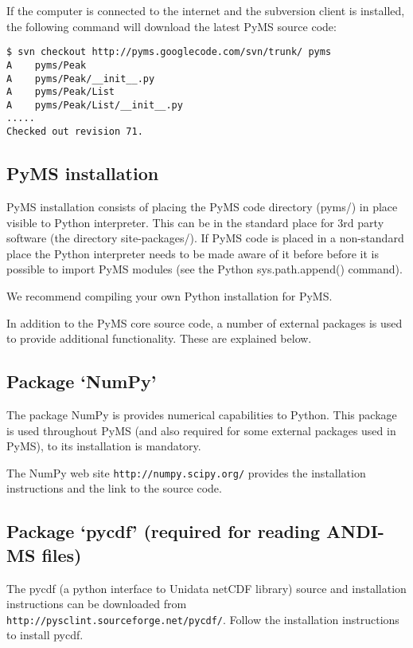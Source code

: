 If the computer is connected to the internet and the subversion client
is installed, the following command will download the latest PyMS source
code:

\begin{verbatim}
$ svn checkout http://pyms.googlecode.com/svn/trunk/ pyms
A    pyms/Peak
A    pyms/Peak/__init__.py
A    pyms/Peak/List
A    pyms/Peak/List/__init__.py
.....
Checked out revision 71.
\end{verbatim}

\subsection{PyMS installation}

PyMS installation consists of placing the PyMS code directory (pyms/) in
place visible to Python interpreter.  This can be in the standard place
for 3rd party software (the directory site-packages/). If PyMS code is
placed in a non-standard place the Python interpreter needs to be made
aware of it before before it is possible to import PyMS modules (see the
Python sys.path.append() command).

We recommend compiling your own Python installation for PyMS.

In addition to the PyMS core source code, a number of external packages
is used to provide additional functionality. These are explained below.

\subsection{\label{subsec:numpy}Package `NumPy'}

The package NumPy is provides numerical capabilities to Python. This
package is used throughout PyMS (and also required for some external
packages used in PyMS), to its installation is mandatory.

The NumPy web site {\tt http://numpy.scipy.org/} provides the installation
instructions and the link to the source code.

\subsection{\label{subsec:pycdf}Package `pycdf' (required for reading
ANDI-MS files)}

The pycdf (a python interface to Unidata netCDF library) source and
installation instructions can be downloaded from\\
{\tt http://pysclint.sourceforge.net/pycdf/}. Follow the installation
instructions to install pycdf.

